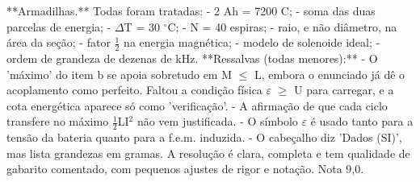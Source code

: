 \documentclass{article}%
\begin{document}
\newline%
**Armadilhas.** Todas foram tratadas:\newline%
{-} 2 Ah = 7200 C;\newline%
{-} soma das duas parcelas de energia;\newline%
{-} $\Delta$T = 30 $^\circ$C;\newline%
{-} N = 40 espiras;\newline%
{-} raio, e não diâmetro, na área da seção;\newline%
{-} fator $\frac12$ na energia magnética;\newline%
{-} modelo de solenoide ideal;\newline%
{-} ordem de grandeza de dezenas de kHz.\newline%
\newline%
**Ressalvas (todas menores):**\newline%
{-} O 'máximo' do item b se apoia sobretudo em M $\leq$ L, embora o enunciado já dê o acoplamento como perfeito. Faltou a condição física $\varepsilon$ $\geq$ U para carregar, e a cota energética aparece só como 'verificação'.\newline%
{-} A afirmação de que cada ciclo transfere no máximo $\frac12$LI$^2$ não vem justificada.\newline%
{-} O símbolo $\varepsilon$ é usado tanto para a tensão da bateria quanto para a f.e.m. induzida.\newline%
{-} O cabeçalho diz 'Dados (SI)', mas lista grandezas em gramas.\newline%
\newline%
A resolução é clara, completa e tem qualidade de gabarito comentado, com pequenos ajustes de rigor e notação. Nota 9,0.%
\end{document}
